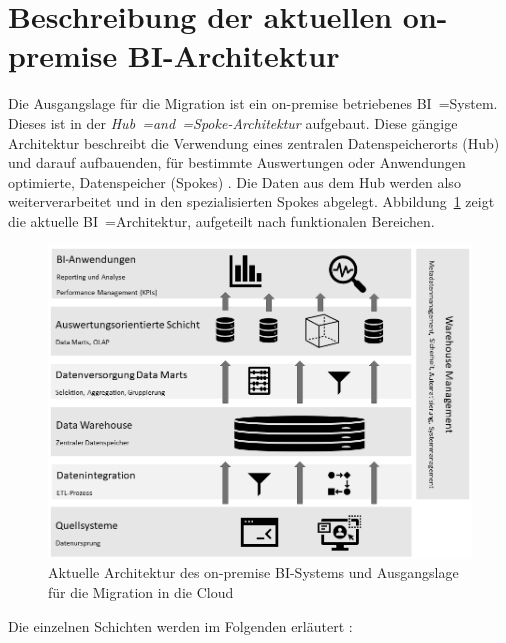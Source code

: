 \section{Beschreibung der aktuellen on-premise BI-Architektur} \label{sec:grundlagen:onpremiseBI}
Die Ausgangslage für die Migration ist ein on-premise betriebenes BI~=System. Dieses ist in der \textit{Hub~=and~=Spoke-Architektur} aufgebaut. Diese gängige Architektur beschreibt die Verwendung eines zentralen Datenspeicherorts (Hub) und darauf aufbauenden, für bestimmte Auswertungen oder Anwendungen optimierte, Datenspeicher (Spokes) \cite{kemper_bi-glossar_2008}. Die Daten aus dem Hub werden also weiterverarbeitet und in den spezialisierten Spokes abgelegt. Abbildung~\ref{fig:aktuelle_onpremise_bi_architektur} zeigt die aktuelle BI~=Architektur, aufgeteilt nach funktionalen Bereichen.
\begin{figure}[htbp]
 \centering
 \includegraphics[width=\textwidth]{gfx/aktuelle_onpremise_bi_architektur.png}
 \caption[Aufbau des on-premise BI-Systems]{Aktuelle Architektur des on-premise BI-Systems und Ausgangslage für die Migration in die Cloud \cite{grunwald_business_2009}\cite{humm_architektur_2005}}
\label{fig:aktuelle_onpremise_bi_architektur}
\end{figure}
Die einzelnen Schichten werden im Folgenden erläutert \cite{grunwald_business_2009}\cite{kemper_bi-glossar_2008}\cite{humm_architektur_2005}:
